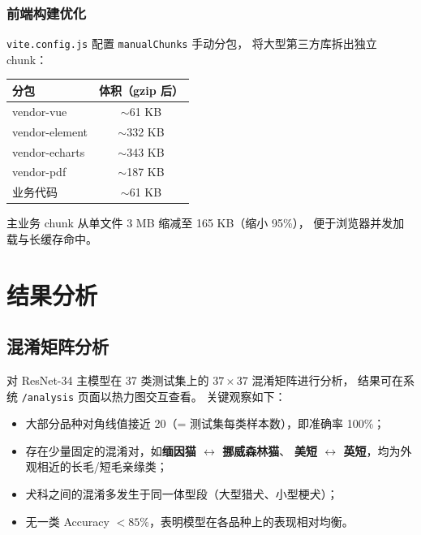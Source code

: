 \documentclass[12pt, a4paper, openany]{ctexbook}
\begin{document}
\subsection{前端构建优化}

\texttt{vite.config.js} 配置 \texttt{manualChunks} 手动分包，
将大型第三方库拆出独立 chunk：

\begin{center}
\begin{tabular}{L{4cm}c}
  \toprule
  \textbf{分包} & \textbf{体积（gzip 后）} \\
  \midrule
  vendor-vue     & $\sim$61 KB \\
  vendor-element & $\sim$332 KB \\
  vendor-echarts & $\sim$343 KB \\
  vendor-pdf     & $\sim$187 KB \\
  业务代码        & $\sim$61 KB \\
  \bottomrule
\end{tabular}
\end{center}

主业务 chunk 从单文件 3 MB 缩减至 165 KB（缩小 95\%），
便于浏览器并发加载与长缓存命中。

\chapter{结果分析}
\label{ch:analysis}

\section{混淆矩阵分析}

对 ResNet-34 主模型在 37 类测试集上的 $37 \times 37$ 混淆矩阵进行分析，
结果可在系统 \texttt{/analysis} 页面以热力图交互查看。
关键观察如下：

\begin{itemize}[leftmargin=*]
  \item 大部分品种对角线值接近 20（= 测试集每类样本数），即准确率 100\%；
  \item 存在少量固定的混淆对，如\textbf{缅因猫 $\leftrightarrow$ 挪威森林猫}、
        \textbf{美短 $\leftrightarrow$ 英短}，均为外观相近的长毛/短毛亲缘类；
  \item 犬科之间的混淆多发生于同一体型段（大型猎犬、小型梗犬）；
  \item 无一类 Accuracy $< 85\%$，表明模型在各品种上的表现相对均衡。
\end{itemize}
\end{document}
